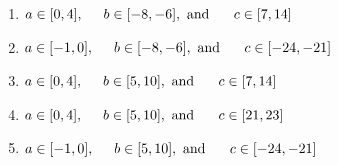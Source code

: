 \documentclass[14pt]{extbook}
\begin{document}
\begin{enumerate}
{\begin{center}
\end{center}
\begin{enumerate}[label=\Alph*.]
\item \( a \in [0, 4], \hspace*{5mm} b \in [-8, -6], \text{ and } \hspace*{5mm} c \in [7, 14] \)
\item \( a \in [-1, 0], \hspace*{5mm} b \in [-8, -6], \text{ and } \hspace*{5mm} c \in [-24, -21] \)
\item \( a \in [0, 4], \hspace*{5mm} b \in [5, 10], \text{ and } \hspace*{5mm} c \in [7, 14] \)
\item \( a \in [0, 4], \hspace*{5mm} b \in [5, 10], \text{ and } \hspace*{5mm} c \in [21, 23] \)
\item \( a \in [-1, 0], \hspace*{5mm} b \in [5, 10], \text{ and } \hspace*{5mm} c \in [-24, -21] \)


\end{enumerate}}
\end{enumerate}
\end{document}
